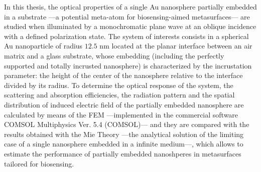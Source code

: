 In this thesis, the optical properties of a single Au nanosphere partially embedded in a substrate ---a potential meta-atom for biosensing-aimed metasurfaces---  are studied when illuminated by a monochromatic plane wave at an oblique incidence with a defined polarization state. The system of interests consists in a spherical Au nanoparticle of radius $12.5$ nm located at the planar interface between an air matrix and a glass substrate, whose embedding (including the perfectly supported and totally incrusted nanosphere) is characterized by the incrustation parameter: the height of the center of the nanosphere relative to the interface divided by its radius. To determine the optical response of the system, the scattering and absorption efficiencies, the radiation pattern and the spatial distribution of induced electric field of the partially embedded nanosphere are calculated by means of the FEM ---implemented in the commercial software COMSOL Multiphysics\texttrademark{} Ver. 5.4 (COMSOL)--- and they are compared with the results obtained with the Mie Theory ---the analytical solution of the limiting case of a single nanosphere embedded in a infinite medium---, which allows to estimate the performance of partially embedded nanoshperes in metasurfaces tailored for biosensing.

